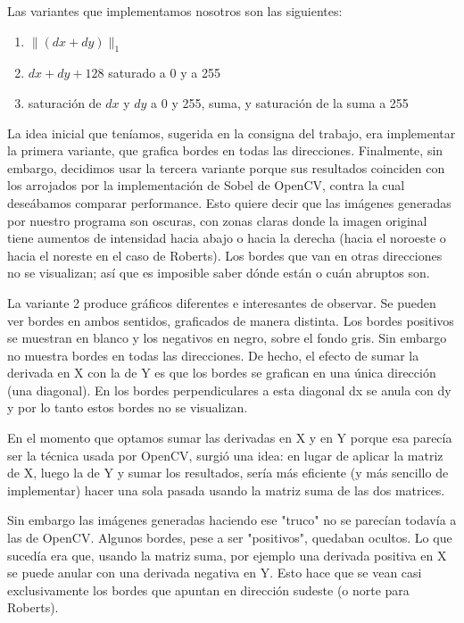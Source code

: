 \smallskip
Las variantes que implementamos nosotros son las siguientes:
\begin{enumerate}
  \item $\rVert (dx + dy ) \rVert_1$%
  \item $dx + dy + 128$ saturado a 0 y a 255
  \item saturación de $dx$ y $dy$ a 0 y 255, suma, y saturación de la suma a 255
\end{enumerate}
\smallskip

La idea inicial que teníamos, sugerida en la consigna del trabajo, era implementar la primera variante, que grafica bordes en todas las direcciones. Finalmente, sin embargo, decidimos usar la tercera variante porque sus resultados coinciden con los arrojados por la implementación de Sobel de OpenCV, contra la cual deseábamos comparar performance. Esto quiere decir que las imágenes generadas por nuestro programa son oscuras, con zonas claras donde la imagen original tiene aumentos de intensidad hacia abajo o hacia la derecha (hacia el noroeste o hacia el noreste en el caso de Roberts). Los bordes que van en otras direcciones no se visualizan; así que es imposible saber dónde están o cuán abruptos son.

La variante 2 produce gráficos diferentes e interesantes de observar. Se pueden ver bordes en ambos sentidos, graficados de manera distinta. Los bordes positivos se muestran en blanco y los negativos en negro, sobre el fondo gris. Sin embargo no muestra bordes en todas las direcciones. De hecho, el efecto de sumar la derivada en X con la de Y es que los bordes se grafican en una única dirección (una diagonal). En los bordes perpendiculares a esta diagonal dx se anula con dy y por lo tanto estos bordes no se visualizan.

En el momento que optamos sumar las derivadas en X y en Y porque esa parecía ser la técnica usada por OpenCV, surgió una idea: en lugar de aplicar la matriz de X, luego la de Y y sumar los resultados, sería más eficiente (y más sencillo de implementar) hacer una sola pasada usando la matriz suma de las dos matrices.

Sin embargo las imágenes generadas haciendo ese "truco" no se parecían todavía a las de OpenCV. Algunos bordes, pese a ser "positivos", quedaban ocultos. Lo que sucedía era que, usando la matriz suma, por ejemplo una derivada positiva en X se puede anular con una derivada negativa en Y. Esto hace que se vean casi exclusivamente los bordes que apuntan en dirección sudeste (o norte para Roberts).

